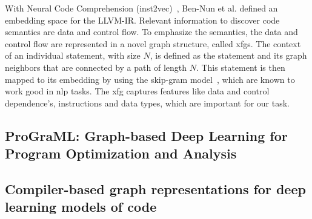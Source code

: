 With Neural Code Comprehension (inst2vec)~\cite{ben2018neural}, Ben-Nun et al. defined an embedding space for the LLVM-IR.
Relevant information to discover code semantics are data and control flow. 
To emphasize the semantics, the data and control flow are represented in a novel graph structure, called \acp{xfg}.
The context of an individual statement, with size $N$, is defined as the statement and its graph neighbors that are connected by a path of length $N$.
This statement is then mapped to its embedding by using the skip-gram model~\cite{mikolov2013distributed}, which are known to work good in \ac{nlp} tasks.
The \ac{xfg} captures features like data and control dependence's, instructions and data types, which are important for our task.

\subsection*{ProGraML: Graph-based Deep Learning for Program Optimization and Analysis}\cite{cummins2020programl}

\subsection*{Compiler-based graph representations for deep learning models of code}\cite{brauckmann2020compiler}

